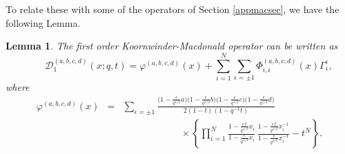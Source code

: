 \documentclass[12pt]{amsart}
\newtheorem{lemma}[thm]{Lemma}
\numberwithin{equation}{section}
\begin{document}
To relate these with some of the operators of Section \ref{appmacsec}, we have the following Lemma.

\begin{lemma}\label{constlem}
The first order  Koornwinder-Macdonald operator can be written as
\begin{equation}
\qquad {\mathcal D}_1^{(a,b,c,d)}(x;q,t)= 
\varphi^{(a,b,c,d)}(x)+
\sum_{i=1}^N\sum_{\epsilon=\pm 1}  \Phi_{i,\epsilon}^{(a,b,c,d)}(x) \Gamma_i^{\epsilon},\nonumber 
\end{equation}
where
\begin{eqnarray}
\varphi^{(a,b,c,d)}(x)&=&\sum_{\epsilon=\pm 1} \frac{\big(1-\frac{\epsilon}{ q^{1/2}}a\big)
\big(1-\frac{\epsilon }{q^{1/2}}b\big)
\big(1-\frac{\epsilon }{q^{1/2}}c\big)\big(1- \frac{\epsilon }{q^{1/2}}d\big)}{2(1-t)(1-q^{-1}t)}\nonumber \\
&&\qquad \qquad\qquad \times 
\left\{ \prod_{i=1}^N  
\frac{1-\frac{\epsilon\, t }{q^{1/2}}x_i}{1-\frac{\epsilon }{q^{1/2}}x_i}\,
\frac{1-\frac{\epsilon\, t }{q^{1/2}}x_i^{-1}}{1-\frac{\epsilon }{q^{1/2}}x_i^{-1}}
-t^N\right\} .\label{valphi}
\end{eqnarray}
\end{lemma}
\end{document}

